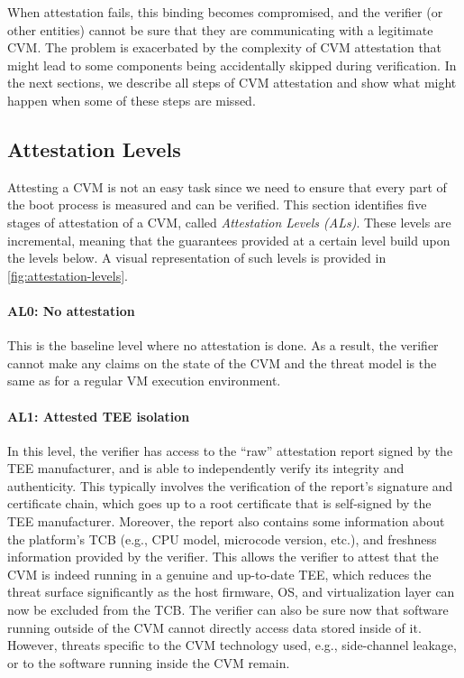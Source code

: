 When attestation fails, this binding becomes compromised, and the verifier (or
other entities) cannot be sure that they are communicating with a legitimate
\ac{CVM}. The problem is exacerbated by the complexity of \ac{CVM} attestation
that might lead to some components being accidentally skipped during
verification. In the next sections, we describe all steps of \ac{CVM}
attestation and show what might happen when some of these steps are missed.

\subsection{Attestation Levels}
\label{section:att-levels}

Attesting a \ac{CVM} is not an easy task since we need to ensure that every part
of the boot process is measured and can be verified. This section identifies
five stages of attestation of a \ac{CVM}, called \emph{Attestation Levels (ALs)}.
These levels are incremental, meaning that the guarantees provided at a certain
level build upon the levels below. A visual representation of such levels is
provided in \cref{fig:attestation-levels}.

\paragraph{AL0: No attestation}
%
This is the baseline level where no attestation is done. As a result, the
verifier cannot make any claims on the state of the \ac{CVM} and the threat
model is the same as for a regular VM execution environment.

\paragraph{AL1: Attested \ac{TEE} isolation}
%
In this level, the verifier has access to the ``raw'' attestation report signed
by the \ac{TEE} manufacturer, and is able to independently verify its integrity
and authenticity. This typically involves the verification of the report's
signature and certificate chain, which goes up to a root certificate that is
self-signed by the \ac{TEE} manufacturer. Moreover, the report also contains
some information about the platform's \ac{TCB} (e.g., CPU model, microcode
version, etc.), and freshness information provided by the verifier. This allows
the verifier to attest that the \ac{CVM} is indeed running in a genuine and
up-to-date \ac{TEE}, which reduces the threat surface significantly as the host
firmware, OS, and virtualization layer can now be excluded from the TCB. The
verifier can also be sure now that software running outside of the CVM cannot
directly access data stored inside of it. However, threats specific to the CVM
technology used, e.g., side-channel leakage, or to the software running inside
the \ac{CVM} remain.

